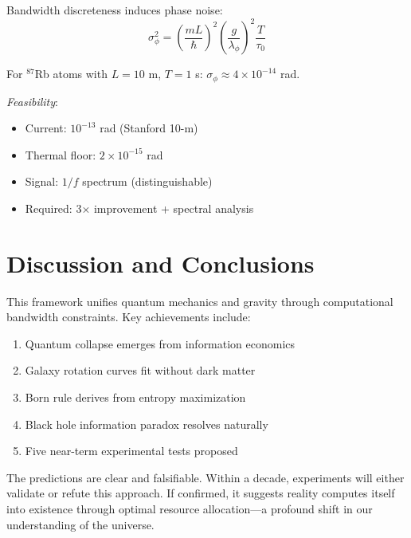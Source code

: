 \documentclass[twocolumn,prd,amsmath,amssymb,aps,superscriptaddress,nofootinbib]{revtex4-2}
\begin{document}
Bandwidth discreteness induces phase noise:
\begin{equation}
\sigma_\phi^2 = \left(\frac{m L}{\hbar}\right)^2 \left(\frac{g}{\lambda_\phi}\right)^2 \frac{T}{\tau_0}
\end{equation}

For $^{87}$Rb atoms with $L = 10$ m, $T = 1$ s: $\sigma_\phi \approx 4 \times 10^{-14}$ rad.

\textit{Feasibility}:
\begin{itemize}
\item Current: $10^{-13}$ rad (Stanford 10-m)
\item Thermal floor: $2 \times 10^{-15}$ rad
\item Signal: $1/f$ spectrum (distinguishable)
\item Required: 3× improvement + spectral analysis
\end{itemize}

\section{Discussion and Conclusions}
\label{sec:discussion}

This framework unifies quantum mechanics and gravity through computational bandwidth constraints. Key achievements include:

\begin{enumerate}
\item Quantum collapse emerges from information economics
\item Galaxy rotation curves fit without dark matter  
\item Born rule derives from entropy maximization
\item Black hole information paradox resolves naturally
\item Five near-term experimental tests proposed
\end{enumerate}

The predictions are clear and falsifiable. Within a decade, experiments will either validate or refute this approach. If confirmed, it suggests reality computes itself into existence through optimal resource allocation—a profound shift in our understanding of the universe.
\end{document}
